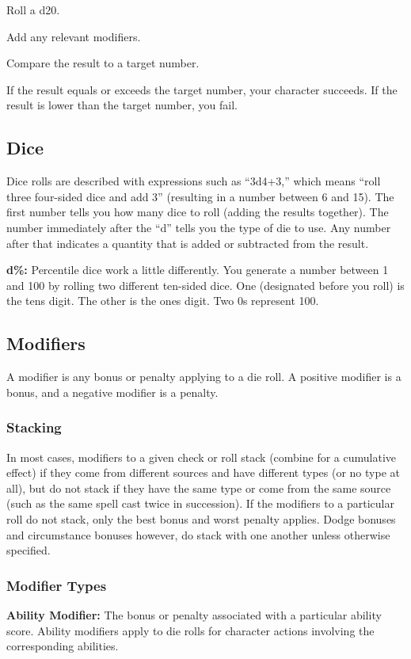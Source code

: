 \begin{itemize*}
\item Roll a d20.
\item Add any relevant modifiers.
\item Compare the result to a target number.
\item If the result equals or exceeds the target number, your character succeeds. If the result is lower than the target number, you fail.
\end{itemize*}

\subsection{Dice}
Dice rolls are described with expressions such as ``3d4+3,'' which means ``roll three four-sided dice and add 3'' (resulting in a number between 6 and 15). The first number tells you how many dice to roll (adding the results together). The number immediately after the ``d'' tells you the type of die to use. Any number after that indicates a quantity that is added or subtracted from the result.

\textbf{d\%:} Percentile dice work a little differently. You generate a number between 1 and 100 by rolling two different ten-sided dice. One (designated before you roll) is the tens digit. The other is the ones digit. Two 0s represent 100.

\subsection{Modifiers}
A modifier is any bonus or penalty applying to a die roll. A positive modifier is a bonus, and a negative modifier is a penalty.

\subsubsection{Stacking}
In most cases, modifiers to a given check or roll stack (combine for a cumulative effect) if they come from different sources and have different types (or no type at all), but do not stack if they have the same type or come from the same source (such as the same spell cast twice in succession). If the modifiers to a particular roll do not stack, only the best bonus and worst penalty applies. Dodge bonuses and circumstance bonuses however, do stack with one another unless otherwise specified.

\subsubsection{Modifier Types}
\textbf{Ability Modifier:} The bonus or penalty associated with a particular ability score. Ability modifiers apply to die rolls for character actions involving the corresponding abilities.

